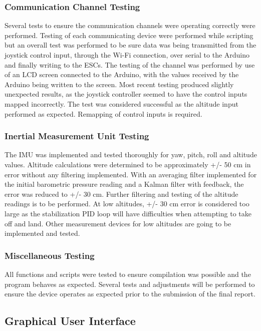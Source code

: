  \subsubsection{Communication Channel Testing}
 
 Several tests to ensure the communication channels were operating correctly were performed. Testing of each communicating device were performed while scripting but an overall test was performed to be sure data was being transmitted from the joystick control input, through the Wi-Fi connection, over serial to the Arduino and finally writing to the ESCs. The testing of the channel was performed by use of an LCD screen connected to the Arduino, with the values received by the Arduino being written to the screen. Most recent testing produced slightly unexpected results, as the joystick controller seemed to have the control inputs mapped incorrectly. The test was considered successful as the altitude input performed as expected. Remapping of control inputs is required. 

\subsubsection{Inertial Measurement Unit Testing}

The IMU was implemented and tested thoroughly for yaw, pitch, roll and altitude values. Altitude calculations were determined to be approximately +/- 50 cm in error without any filtering implemented. With an averaging filter implemented for the initial barometric pressure reading and a Kalman filter with feedback, the error was reduced to +/- 30 cm. Further filtering and testing of the altitude readings is to be performed. At low altitudes, +/- 30 cm error is considered too large as the stabilization PID loop will have difficulties when attempting to take off and land. Other measurement devices for low altitudes are going to be implemented and tested.

\subsubsection{Miscellaneous Testing}

All functions and scripts were tested to ensure compilation was possible and the program behaves as expected. Several tests and adjustments will be performed to ensure the device operates as expected prior to the submission of the final report. 




\subsection{Graphical User Interface}

